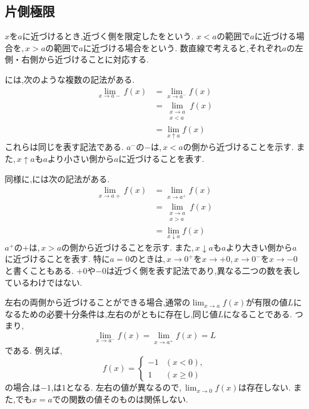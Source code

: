   \subsection{片側極限}\label{節：片側極限}
    $x$を$a$に近づけるとき,近づく側を限定したを\textbf{}という.
    $x<a$の範囲で$a$に近づける場合を\textbf{},\,$x>a$の範囲で$a$に近づける場合を\textbf{}という.
    数直線で考えると,それぞれ$a$の左側・右側から近づけることに対応する.

    には,次のような複数の記法がある.
    \[
      \boxed{
        \begin{aligned}
          \lim_{x\to a-}f(x)
          &=\lim_{x\to a^-}f(x)\\
          &=\lim_{\substack{x\to a\\x<a}}f(x)\\
          &=\lim_{x\uparrow a}f(x)
        \end{aligned}
      }
    \]
    これらは同じを表す記法である.
    $a^-$の$-$は,\,$x<a$の側から近づけることを示す.
    また,\,$x\uparrow a$も$a$より小さい側から$a$に近づけることを表す.

    同様に,には次の記法がある.
    \[
      \boxed{
        \begin{aligned}
          \lim_{x\to a+}f(x)
          &=\lim_{x\to a^+}f(x)\\
          &=\lim_{\substack{x\to a\\x>a}}f(x)\\
          &=\lim_{x\downarrow a}f(x)
        \end{aligned}
      }
    \]
    $a^+$の$+$は,\,$x>a$の側から近づけることを示す.
    また,\,$x\downarrow a$も$a$より大きい側から$a$に近づけることを表す.
    特に$a=0$のときは,\,$x\to0^+$を$x\to+0$,\,$x\to0^-$を$x\to-0$と書くこともある.
    $+0$や$-0$は近づく側を表す記法であり,異なる二つの数を表しているわけではない.

    左右の両側から近づけることができる場合,通常の$\lim_{x\to a}f(x)$が有限の値$L$になるための必要十分条件は,左右のがともに存在し,同じ値$L$になることである.
    つまり,
    \[
      \lim_{x\to a^-}f(x)
      =\lim_{x\to a^+}f(x)=L
    \]
    である.
    例えば,
    \[
      f(x)=
      \begin{cases}
        -1 & (x<0),\\
        1 & (x\ge0)
      \end{cases}
    \]
    の場合,は$-1$,は$1$となる.
    左右の値が異なるので,\,$\lim_{x\to0}f(x)$は存在しない.
    また,でも$x=a$での関数の値そのものは関係しない.

